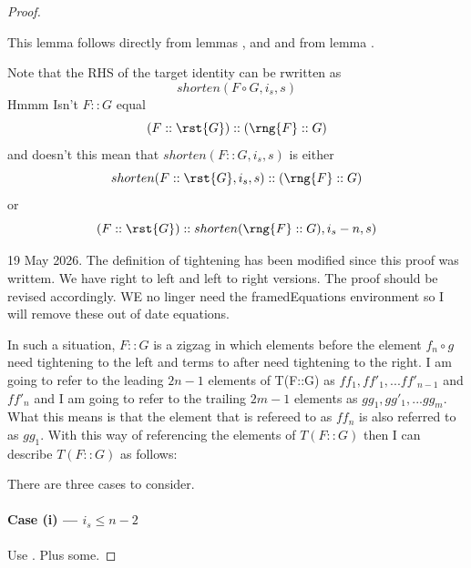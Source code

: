 \begin{proof}
\begin{newtt}
This lemma follows directly from lemmas 
,
 and
 and from
lemma .

Note that the RHS of the target identity can be rwritten as
\[
shorten(F \circ G,i_s,s)
\]
Hmmm
Isn't $F::G$ equal
\[
(F::\rst{G})::(\rng{F} :: G)
\]
and doesn't this mean that $shorten(F::G,i_s,s)$ is
either
\[
shorten(F::\rst{G},i_s,s) ::(\rng{F}::G)
\]
or
\[
(F::\rst{G}) :: shorten(\rng{F}::G),i_s - n, s)
\]

\end{newtt}


\begin{aside}
19 May 2026.
The definition of tightening has been modified since this proof was writtem.
We have right to left and left to right versions. The proof should be revised accordingly.
WE no linger need the framedEquations environment so I will remove these
out of date equations.
\end{aside}
In such a situation, $F::G$ is a zigzag in which 
elements before the element $f_n \circ g$ need 
tightening to the left and terms to after need tightening to the right. 
I am going to refer to  the leading $2n -1$ elements of T(F::G)
as $ff_1, ff'_1,...ff'_{n-1}$ and $ff'_n$ and I am going to refer 
to the trailing $2m-1$ elements as $gg_1,gg'_1,...gg_m$.
What  this means is that the element that is refereed to as
$ff_n$ is also referred to as $gg_1$. 
With this way of referencing the elements of $T(F::G)$ 
then I can describe $T(F::G)$ as follows:
\tbd
 

There are three cases to consider.
\paragraph{Case (i) --- $i_s \leq  n-2$}
Use . Plus some.


\end{proof}
